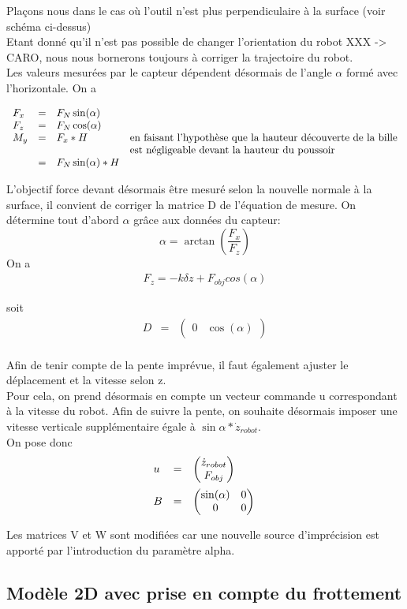 \documentclass[12pt,twoside,a4paper]{article}
\begin{document}
\vspace{1cm}
Plaçons nous dans le cas où l'outil n'est plus perpendiculaire à la surface (voir schéma ci-dessus)\\

Etant donné qu'il n'est pas possible de changer l'orientation du robot XXX -> CARO, nous nous bornerons toujours à corriger la trajectoire du robot. \\

\vspace{1cm}
Les valeurs mesurées par le capteur dépendent désormais de l'angle $\alpha$ formé avec l'horizontale. On a 

$$
\begin{array}{lllll}
F_x &=& F_N \sin(\alpha) &\\
F_z &=& F_N \cos(\alpha) &\\
M_y &= &F_x*H & \text{en faisant l'hypothèse que la hauteur découverte de la bille} \\ 
	&&& \text{est négligeable devant la hauteur du poussoir} \\
	&= &F_N \sin(\alpha)*H &
	\begin{array}[t]{l}
	
	\end{array}
\end{array}
$$

L'objectif force devant désormais être mesuré selon la nouvelle normale à la surface, il convient de corriger la matrice D de l'équation de mesure.
On détermine tout d'abord $\alpha$ grâce aux données du capteur:
$$ \alpha = \arctan(\frac{F_{x}}{F_{z}}) $$
On a 
$$
\begin{array}{lll}
F_{z} = -k \delta z + F_{obj} cos(\alpha)
\end{array}
$$

soit 
$$
\begin{array}{lll}
D &=& \begin{pmatrix} 0 & \cos(\alpha) \end{pmatrix} \\ 
\end{array}
$$

Afin de tenir compte de la pente imprévue, il faut également ajuster le déplacement et la vitesse selon z. \\
Pour cela, on prend désormais en compte un vecteur commande u correspondant à la vitesse du robot. Afin de suivre la pente, on souhaite désormais imposer une vitesse verticale supplémentaire égale à $\sin{\alpha}*\dot{z}_{robot}$. \\
On pose donc
$$ 
\begin{array}{lll}
u &=& \begin{pmatrix} \dot{z}_{robot} \\ F_{obj}\end{pmatrix} \\
B &=& \begin{pmatrix}	\sin(\alpha) & 0 \\ 0 & 0  \end{pmatrix} \rule{0pt}{20pt}\\
\end{array}
$$



\noindent Les matrices V et W sont modifiées car une nouvelle source d'imprécision est apporté par l'introduction du paramètre alpha. 


\subsection{Modèle 2D avec prise en compte du frottement}
\end{document}
